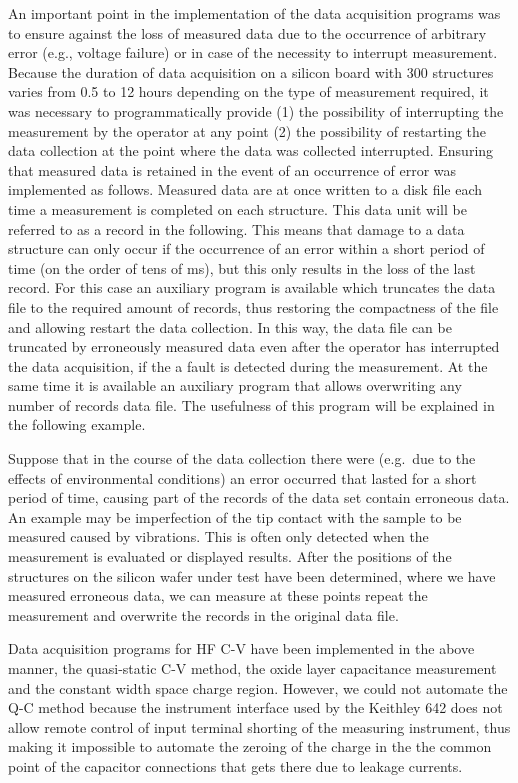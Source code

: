 An important point in the implementation of the data acquisition
programs was to ensure against the loss of measured data due to the
occurrence of arbitrary error (e.g., voltage failure) or in case of
the necessity to interrupt measurement. Because the duration of data
acquisition on a silicon board with 300 structures varies from 0.5 to
12 hours depending on the type of measurement required, it was
necessary to programmatically provide (1) the possibility of
interrupting the measurement by the operator at any point (2) the
possibility of restarting the data collection at the point where the
data was collected interrupted. Ensuring that measured data is
retained in the event of an occurrence of error was implemented as
follows. Measured data are at once written to a disk file each time a
measurement is completed on each structure. This data unit will be
referred to as a record in the following. This means that damage to a
data structure can only occur if the occurrence of an error within a
short period of time (on the order of tens of ms), but this only
results in the loss of the last record. For this case an auxiliary
program is available which truncates the data file to the required
amount of records, thus restoring the compactness of the file and
allowing restart the data collection. In this way, the data file can
be truncated by erroneously measured data even after the operator has
interrupted the data acquisition, if the a fault is detected during
the measurement. At the same time it is available an auxiliary program
that allows overwriting any number of records data file. The
usefulness of this program will be explained in the following example.

Suppose that in the course of the data collection there were
(e.g.\ due to the effects of environmental conditions) an error
occurred that lasted for a short period of time, causing part of the
records of the data set contain erroneous data. An example may be
imperfection of the tip contact with the sample to be measured caused
by vibrations. This is often only detected when the measurement is
evaluated or displayed results. After the positions of the structures
on the silicon wafer under test have been determined, where we have
measured erroneous data, we can measure at these points repeat the
measurement and overwrite the records in the original data file.

Data acquisition programs for HF C-V have been implemented in the
above manner, the quasi-static C-V method, the oxide layer capacitance
measurement and the constant width space charge region. However, we
could not automate the Q-C method because the instrument interface
used by the Keithley 642 does not allow remote control of input
terminal shorting of the measuring instrument, thus making it
impossible to automate the zeroing of the charge in the the common
point of the capacitor connections that gets there due to leakage
currents.

